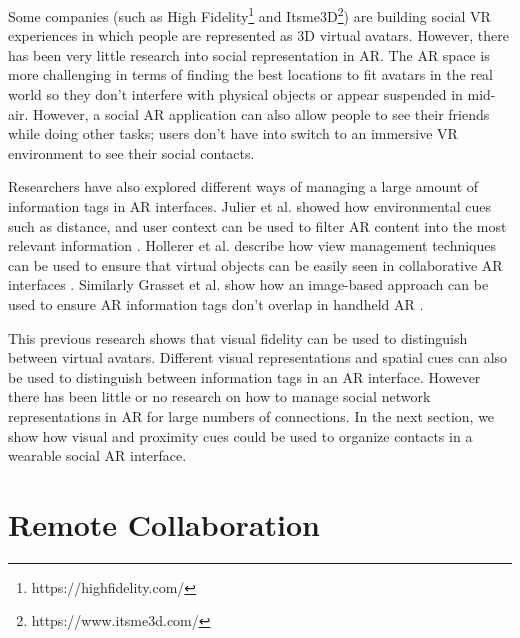 Some companies (such as High Fidelity\footnote{https://highfidelity.com/} and Itsme3D\footnote{https://www.itsme3d.com/}) are building social VR experiences in which people are represented as 3D virtual avatars.
However, there has been very little research into social representation in AR. The AR space is more challenging in terms of finding the best locations to fit avatars in the real world so they don't interfere with physical objects or appear suspended in mid-air. However, a social  AR application can also allow people to see their friends while doing other tasks; users don't have into switch to an immersive VR environment to see their social contacts.


Researchers have also explored different ways of managing a large amount of information tags in AR interfaces.  Julier et al. showed how environmental cues such as distance, and user context can be used to filter AR content into the most relevant information \cite{Julier2002}. Hollerer et al. describe how view management techniques can be used to ensure that virtual objects can be easily seen in collaborative AR interfaces \cite{Hollerer2001}. Similarly Grasset et al. show how an image-based approach can be used to ensure AR information tags don't overlap in handheld AR \cite{Grasset2012}. 

This previous research shows that visual fidelity can be used to distinguish between virtual avatars. Different visual representations and spatial cues can also be used to distinguish between information tags in an AR interface. However there has been little or no research on how to manage social network representations in AR for large numbers of connections. In the next section, we show how visual and proximity cues could be used to organize contacts in a wearable social AR interface.


\section{Remote Collaboration}

